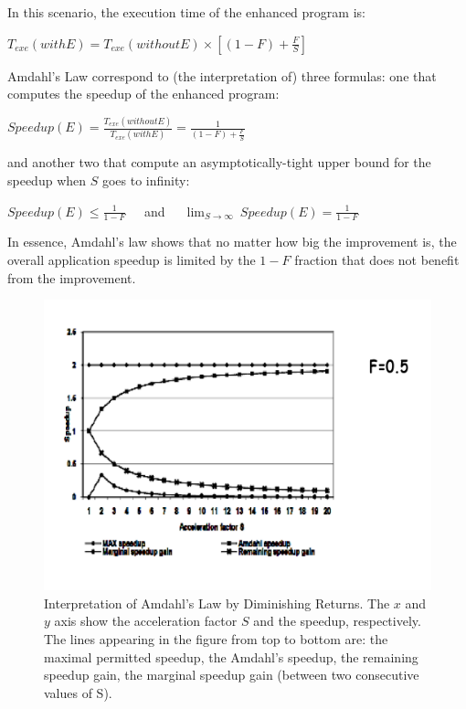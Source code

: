 \documentclass[acmsmall,review]{acmart}\settopmatter{printfolios=true,printccs=false,printacmref=false}
\begin{document}
In this scenario, the execution time of the enhanced program is:
\begin{center}
$T_{exe}(with E) = T_{exe}(without E)\times[(1-F) + \frac{F}{S}]$
\end{center}
Amdahl's Law correspond to (the interpretation of) three formulas:
one that computes the speedup of the enhanced program:
\begin{center}
$Speedup(E) = \frac{T_{exe}(without E)}{T_{exe}(with E)} = \frac{1}{(1-F)+\frac{F}{S}}$
\end{center}
and another two that compute an asymptotically-tight upper bound 
for the speedup when $S$ goes to infinity: 
\begin{center}
$Speedup(E) \leq \frac{1}{1-F}~~~~~$ and $~~~~~\lim_{S\to\infty}~Speedup(E) = \frac{1}{1-F}$
\end{center}

In essence, Amdahl's law shows that no matter how big the improvement is,
the overall application speedup is limited by the $1-F$ fraction that
does not benefit from the improvement.

\begin{figure}
\vspace{-4ex}
\includegraphics[width=90ex]{Figures/L2/AmdhalDimRet}\vspace{-7ex}
\caption{Interpretation of Amdahl's Law by Diminishing Returns. The $x$ and $y$ axis show the acceleration factor $S$ and the speedup, respectively. The lines appearing in the figure from top to bottom are: the maximal permitted speedup, the Amdahl's speedup, the remaining speedup gain, the marginal speedup gain (between two consecutive values of S).}
\label{fig:amdahl-interp}
\end{figure}
\end{document}

